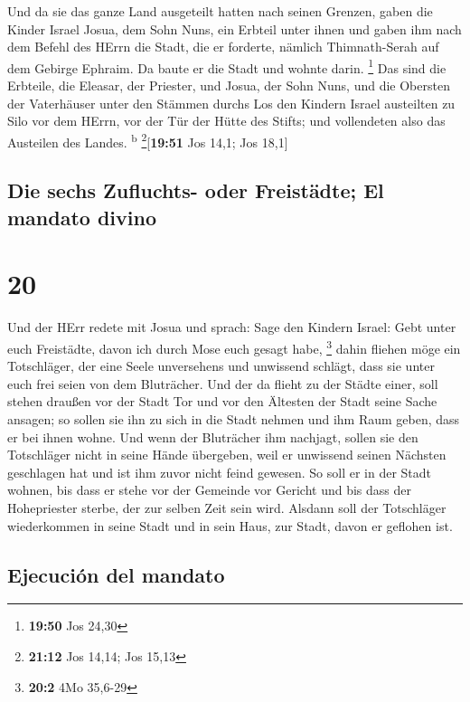  Und da sie das ganze Land ausgeteilt hatten nach seinen
Grenzen, gaben die Kinder Israel Josua, dem Sohn Nuns, ein Erbteil unter
ihnen  und gaben ihm nach dem Befehl des HErrn die Stadt,
die er forderte, nämlich Thimnath-Serah auf dem Gebirge Ephraim. Da
baute er die Stadt und wohnte darin. \footnote{\textbf{19:50} Jos 24,30}
 Das sind die Erbteile, die Eleasar, der Priester, und
Josua, der Sohn Nuns, und die Obersten der Vaterhäuser unter den Stämmen
durchs Los den Kindern Israel austeilten zu Silo vor dem HErrn, vor der
Tür der Hütte des Stifts; und vollendeten also das Austeilen des Landes.
\textsuperscript{b} \footnote{\textbf{21:12} Jos 14,14; Jos 15,13}{[}\textbf{19:51}
Jos 14,1; Jos 18,1{]}

\hypertarget{die-sechs-zufluchts--oder-freistuxe4dte-el-mandato-divino}{%
\subsection{Die sechs Zufluchts- oder Freistädte; El mandato
divino}\label{die-sechs-zufluchts--oder-freistuxe4dte-el-mandato-divino}}

\hypertarget{section-19}{%
\section{20}\label{section-19}}

 Und der HErr redete mit Josua und sprach: 
Sage den Kindern Israel: Gebt unter euch Freistädte, davon ich durch
Mose euch gesagt habe, \footnote{\textbf{20:2} 4Mo 35,6-29}
 dahin fliehen möge ein Totschläger, der eine Seele
unversehens und unwissend schlägt, dass sie unter euch frei seien von
dem Bluträcher.  Und der da flieht zu der Städte einer,
soll stehen draußen vor der Stadt Tor und vor den Ältesten der Stadt
seine Sache ansagen; so sollen sie ihn zu sich in die Stadt nehmen und
ihm Raum geben, dass er bei ihnen wohne.  Und wenn der
Bluträcher ihm nachjagt, sollen sie den Totschläger nicht in seine Hände
übergeben, weil er unwissend seinen Nächsten geschlagen hat und ist ihm
zuvor nicht feind gewesen.  So soll er in der Stadt
wohnen, bis dass er stehe vor der Gemeinde vor Gericht und bis dass der
Hohepriester sterbe, der zur selben Zeit sein wird. Alsdann soll der
Totschläger wiederkommen in seine Stadt und in sein Haus, zur Stadt,
davon er geflohen ist.

\hypertarget{ejecuciuxf3n-del-mandato}{%
\subsection{Ejecución del mandato}\label{ejecuciuxf3n-del-mandato}}

